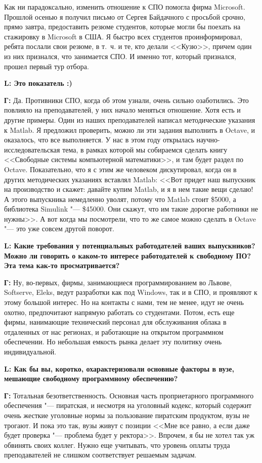 \documentclass[10pt, a5paper]{article}
\begin{document}
Как ни парадоксально, изменить отношение к СПО помогла фирма Microsoft. Прошлой осенью я получил письмо от Сергея Байдачного с просьбой срочно, прямо завтра, предоставить резюме студентов, которые могли бы поехать на стажировку в Microsoft в США. Я быстро всех студентов проинформировал, ребята послали свои резюме, в т.~ч. и те, кто делали <<Кузю>>, причем один из них признался, что занимается СПО. И именно тот, который признался, прошел первый тур отбора. 

{\noindent \bf L: Это показатель :)}

{\noindent \bf Г:} Да. Противники СПО, когда об этом узнали, очень сильно озаботились. Это повлияло на преподавателей, у них начало меняться отношение. Хотя есть и другие примеры. Один из наших преподавателей написал методические указания к Matlab. Я предложил проверить, можно ли эти задания выполнить в Octave, и оказалось, что все выполняется. У нас в этом году открылась научно-исследовательская тема, в рамках которой мы собираемся сделать книгу <<Свободные системы компьютерной математики>>, и там будет раздел по Octave. Показательно, что я с этим же человеком дискутировал, когда он в других методических указаниях вставлял Matlab: <<Вот придет наш выпускник на производство и скажет: давайте купим Matlab, и я в нем такие вещи сделаю! А этого выпускника немедленно уволят, потому что Matlab стоит \$5000, а библиотека Simulink "--- \$45000. Они скажут, что им такие дорогие работники не нужны>>. А вот когда мы посмотрели, что то же самое можно сделать в Octave "--- это уже совсем другой поворот.

{\noindent \bf L: Какие требования у потенциальных работодателей ваших выпускников? Можно ли говорить о каком-то интересе работодателей к свободному ПО? Эта тема как-то просматривается?}

{\noindent \bf Г:} Ну, во-первых, фирмы, занимающиеся программированием во Львове, Softserve, Eleks, ведут разработки как под Windows, так и в СПО, и проявляют к этому большой интерес. Но на контакты с нами, тем не менее, идут не очень охотно, предпочитают напрямую работать со студентами. Потом, есть еще фирмы, нанимающие технический персонал для обслуживания облака в отдаленных от нас регионах, и работающие на открытом программном обеспечении. Но небольшая емкость рынка делает эту политику очень индивидуальной.

{\noindent \bf L: Как бы вы, коротко, охарактеризовали основные факторы в вузе, мешающие свободному программному обеспечению?}

{\noindent \bf Г:} Тотальная безответственность. Основная часть проприетарного программного обеспечения "--- пиратская, и несмотря на уголовный кодекс, который содержит очень жесткие уголовные нормы за пользование пиратским продуктом, вузы не трогают. И пока это так, вузы живут с позиции <<Мне все равно, а если даже будет проверка "--- проблема будет у ректора>>. Впрочем, я бы не хотел так уж обвинять своих коллег. Нужно еще учитывать, что уровень оплаты труда преподавателей не слишком соответствует решаемым задачам.
\end{document}
